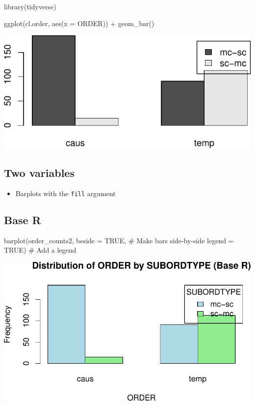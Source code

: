\documentclass[
  11pt,
  letterpaper,
  DIV=11,
  numbers=noendperiod]{scrreprt}
\newenvironment{Shaded}{\begin{snugshade}}{\end{snugshade}}
\newcommand{\AttributeTok}[1]{\textcolor[rgb]{0.40,0.45,0.13}{#1}}
\newcommand{\CommentTok}[1]{\textcolor[rgb]{0.37,0.37,0.37}{#1}}
\newcommand{\ConstantTok}[1]{\textcolor[rgb]{0.56,0.35,0.01}{#1}}
\newcommand{\FunctionTok}[1]{\textcolor[rgb]{0.28,0.35,0.67}{#1}}
\newcommand{\NormalTok}[1]{\textcolor[rgb]{0.00,0.23,0.31}{#1}}
\newcommand{\SpecialCharTok}[1]{\textcolor[rgb]{0.37,0.37,0.37}{#1}}
\providecommand{\tightlist}{%
  \setlength{\itemsep}{0pt}\setlength{\parskip}{0pt}}\usepackage{longtable,booktabs,array}
\begin{document}
\begin{Shaded}
\begin{Highlighting}[]
\FunctionTok{library}\NormalTok{(tidyverse)}

\FunctionTok{ggplot}\NormalTok{(cl.order, }\FunctionTok{aes}\NormalTok{(}\AttributeTok{x =}\NormalTok{ ORDER)) }\SpecialCharTok{+}
  \FunctionTok{geom\_bar}\NormalTok{()}
\end{Highlighting}
\end{Shaded}

\includegraphics{Categorical_data_files/figure-pdf/unnamed-chunk-11-1.pdf}

\subsection{Two variables}\label{two-variables-1}

\begin{itemize}
\tightlist
\item
  Barplots with the \texttt{fill} argument
\end{itemize}

\subsection{Base R}

\begin{Shaded}
\begin{Highlighting}[]
\FunctionTok{barplot}\NormalTok{(order\_counts2, }
        \AttributeTok{beside =} \ConstantTok{TRUE}\NormalTok{,  }\CommentTok{\# Make bars side{-}by{-}side}
        \AttributeTok{legend =} \ConstantTok{TRUE}\NormalTok{)  }\CommentTok{\# Add a legend}
\end{Highlighting}
\end{Shaded}

\includegraphics{Categorical_data_files/figure-pdf/unnamed-chunk-12-1.pdf}
\end{document}
